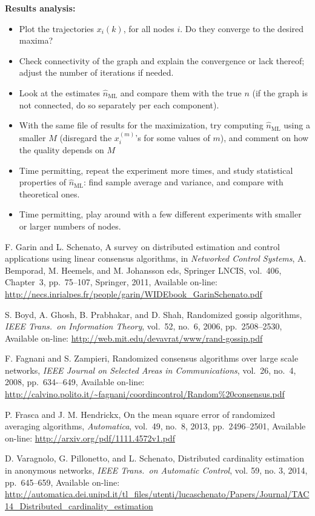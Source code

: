 \documentclass{article}
\begin{document}
\textbf{Results analysis:}
\begin{itemize}
\item Plot the trajectories $x_i(k)$, for all nodes $i$. Do they converge to the desired maxima?
\item Check connectivity of the graph and explain the convergence or lack thereof; adjust the number of iterations if needed.
\item Look at the estimates $\hat{n}_{\text{ML}}$ and compare them with the true $n$ (if the graph is not connected, do so separately per each component).
\item With the same file of results for the maximization, try computing $\hat{n}_{\text{ML}}$ using a smaller $M$ (disregard the $x_i^{(m)}$'s for some values of $m$), and comment on how the quality depends on $M$
\item Time permitting, repeat the experiment more times, and study statistical properties of $\hat{n}_{\text{ML}}$: find sample average and variance, and compare with theoretical ones.
\item Time permitting, play around with a few different experiments with smaller or larger numbers of nodes.
\end{itemize}


\begin{thebibliography}{99}

F. Garin and L. Schenato, A survey on distributed estimation and control applications using linear consensus algorithms, in {\it Networked Control Systems}, A. Bemporad, M. Heemels, and M. Johansson eds, Springer LNCIS, vol.~406, Chapter~3, pp.~75--107, Springer, 2011, Available on-line: \url{http://necs.inrialpes.fr/people/garin/WIDEbook_GarinSchenato.pdf}


S. Boyd, A. Ghosh, B. Prabhakar, and D. Shah, Randomized gossip algorithms, {\it IEEE Trans.\ on Information Theory}, vol.~52, no.~6, 2006, pp.~2508--2530, Available on-line: \url{http://web.mit.edu/devavrat/www/rand-gossip.pdf}


F. Fagnani and S. Zampieri, Randomized consensus algorithms over large scale networks,
{\it IEEE Journal on Selected Areas in Communications}, vol.~26, no.~4, 2008, pp.~634-–649, Available on-line:
\url{http://calvino.polito.it/~fagnani/coordincontrol/Random%20consensus.pdf}

P. Frasca and J. M. Hendrickx, On the mean square error of randomized averaging algorithms, {\it Automatica}, vol.~49, no.~8, 2013, pp.~2496--2501, Available on-line: \url{http://arxiv.org/pdf/1111.4572v1.pdf}

D. Varagnolo, G. Pillonetto, and L. Schenato, Distributed cardinality estimation in anonymous networks,
{\it  IEEE Trans.\ on Automatic Control},  vol. 59, no. 3, 2014, pp.~645--659, Available on-line:
\url{http://automatica.dei.unipd.it/tl_files/utenti/lucaschenato/Papers/Journal/TAC14_Distributed_cardinality_estimation}


\end{thebibliography}
\end{document}
